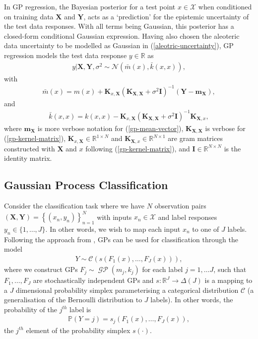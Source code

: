 \documentclass{article}
\newcommand{\GP}{\operatorname{\mathcal{GP}}}
\numberwithin{equation}{section}
\begin{document}
In GP regression, the Bayesian posterior for a test point $x \in \mathcal{X}$ when conditioned on training data $\mathbf{X}$ and $\mathbf{Y}$, acts as a `prediction' for the epistemic uncertainty of the test data responses. With all terms being Gaussian, this posterior has a closed-form conditional Gaussian expression.
Having also chosen the aleoteric data uncertainty to be modelled as Gaussian in (\ref{aleotric-uncertainty}), GP regression models the test data response $y \in \mathbb{R}$ as
\begin{align}
    y \vert \mathbf{X}, \mathbf{Y}, \sigma^2 
    \sim \mathcal{N}\left(\bar{m}(x), \bar{k}(x, x)\right),
    \label{gp-posterior-normal}
\end{align}
with
\begin{align}
    \label{gp-posterior-mean}
    \bar{m}(x) = m(x) + \mathbf{K}_{x, \mathbf{X}} \left(\mathbf{K}_{\mathbf{X}, \mathbf{X}} + \sigma^2 \mathbf{I}\right)^{-1} \left( \mathbf{Y} - \mathbf{m}_{\mathbf{X}}\right),
\end{align}
and
\begin{align}
    \label{gp-posterior-covariance}
    \bar{k}(x, x) = k(x, x) - \mathbf{K}_{x, \mathbf{X}} \left(\mathbf{K}_{\mathbf{X}, \mathbf{X}} + \sigma^2 \mathbf{I}\right)^{-1} \mathbf{K}_{\mathbf{X}, x},
\end{align}
where $\mathbf{m}_{\mathbf{X}}$ is more verbose notation for (\ref{gp-mean-vector}), $\mathbf{K}_{\mathbf{X}, \mathbf{X}}$ is verbose for (\ref{gp-kernel-matrix}), $\mathbf{K}_{x, \mathbf{X}} \in \mathbb{R}^{1 \times N}$ and $\mathbf{K}_{\mathbf{X}, x} \in \mathbb{R}^{N \times 1}$ are gram matrices constructed with $\mathbf{X}$ and $x$ following (\ref{gp-kernel-matrix}), and $\mathbf{I} \in \mathbb{R}^{N \times N}$ is the identity matrix.

\subsection{Gaussian Process Classification}
Consider the classification task where we have $N$ observation pairs $(\mathbf{X}, \mathbf{Y}) = \left\{(x_n, y_n)\right\}_{n=1}^{N}$ with inputs $x_n \in \mathcal{X}$ and label responses $y_n \in \{1, \dots, J\}$. In other words, we wish to map each input $x_n$ to one of $J$ labels. Following the approach from \cite{matthews2017scalable}, GPs can be used for classification through the model
\begin{align}
    Y \sim \mathcal{C}\left(s(F_1(x), \dots, F_J(x))\right),
    \label{gp-classifier}
\end{align}
where we construct GPs $F_j \sim \GP\left(m_j, k_j\right)$ for each label $j=1, \dots J$, such that $F_1, \dots, F_J$ are stochastically independent GPs and $s: \mathbb{R}^J \rightarrow \Delta(J)$ is a mapping to a $J$ dimensional probability simplex parameterising a categorical distribution $\mathcal{C}$ (a generalisation of the Bernoulli distribution to $J$ labels). In other words, the probability of the $j^{th}$ label is
\begin{align}
    \mathbb{P}(Y=j) = s_j(F_1(x), \dots, F_J(x)),
\end{align}
the $j^{th}$ element of the probability simplex $s(\cdot)$.
\end{document}
